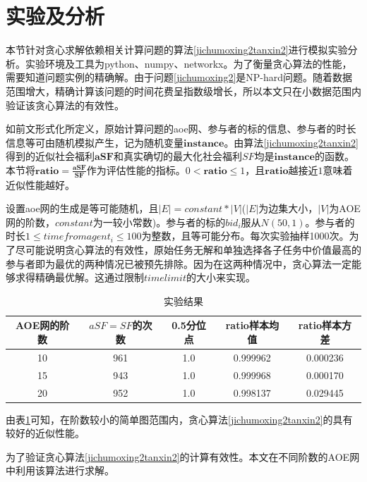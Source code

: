 \documentclass[promaster]{thesis-uestc}
\begin{document}
\section{实验及分析}

本节针对贪心求解依赖相关计算问题的算法\ref{jichumoxing2tanxin2}进行模拟实验分析。实验环境及工具为python、numpy、networkx。为了衡量贪心算法的性能，需要知道问题实例的精确解。由于问题\ref{jichumoxing2}是NP-hard问题。随着数据范围增大，精确计算该问题的时间花费呈指数级增长，所以本文只在小数据范围内验证该贪心算法的有效性。

如前文形式化所定义，原始计算问题的aoe网、参与者的标的信息、参与者的时长信息等可由随机模拟产生，记为随机变量$\mathbf{instance}$。由算法\ref{jichumoxing2tanxin2}得到的近似社会福利$\mathbf{aSF}$和真实确切的最大化社会福利$SF$均是$\mathbf{instance}$的函数。本节将$\mathbf{ratio} = \frac{\mathbf{aSF}}{\mathbf{SF}}$作为评估性能的指标。$0<\mathbf{ratio} \leq 1$，且$\mathbf{ratio}$越接近$1$意味着近似性能越好。

设置aoe网的生成是等可能随机，且$|E|=constant*|V|$($|E|$为边集大小，$|V|$为AOE网的阶数，$constant$为一较小常数)。参与者的标的$bid_i$服从$N(50,1)$。参与者的时长$1\leq timefromagent_i\leq 100$为整数，且等可能分布。每次实验抽样1000次。为了尽可能说明贪心算法的有效性，原始任务无解和单独选择各子任务中价值最高的参与者即为最优的两种情况已被预先排除。因为在这两种情况中，贪心算法一定能够求得精确最优解。这通过限制$timelimit$的大小来实现。

\begin{table}[h]
\caption{实验结果}
\label{jinsizhibiao}
\begin{tabular}{ccccc}
    \toprule
    AOE网的阶数&$aSF=SF$的次数&0.5分位点&ratio样本均值&ratio样本方差\\
    \midrule
    10&961&1.0&0.999962&0.000236\\
    15&943&1.0&0.999968&0.000170\\
    20&952&1.0&0.998137&0.029445\\
    \bottomrule
\end{tabular}
\end{table}

由表\ref{jinsizhibiao}可知，在阶数较小的简单图范围内，贪心算法\ref{jichumoxing2tanxin2}的具有较好的近似性能。

为了验证贪心算法\ref{jichumoxing2tanxin2}的计算有效性。本文在不同阶数的AOE网中利用该算法进行求解。
\end{document}

